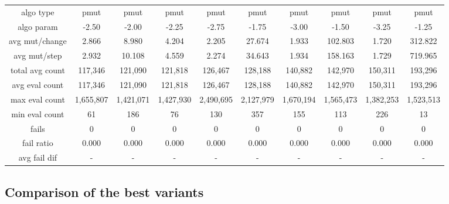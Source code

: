 \begin{tabular}[h]{cccccccccc}
algo type&                pmut&         pmut&         pmut&         pmut&         pmut&         pmut&         pmut&         pmut&         pmut\\
algo param&              -2.50&        -2.00&        -2.25&        -2.75&        -1.75&        -3.00&        -1.50&        -3.25&        -1.25\\
avg mut/change&          2.866&        8.980&        4.204&        2.205&       27.674&        1.933&      102.803&        1.720&      312.822\\
avg mut/step&            2.932&       10.108&        4.559&        2.274&       34.643&        1.934&      158.163&        1.729&      719.965\\
\hline
total avg count&       117,346&      121,090&      121,818&      126,467&      128,188&      140,882&      142,970&      150,311&      193,296\\
avg eval count&        117,346&      121,090&      121,818&      126,467&      128,188&      140,882&      142,970&      150,311&      193,296\\
max eval count&      1,655,807&    1,421,071&    1,427,930&    2,490,695&    2,127,979&    1,670,194&    1,565,473&    1,382,253&    1,523,513\\
min eval count&             61&          186&           76&          130&          357&          155&          113&          226&           13\\
\hline
fails&                       0&            0&            0&            0&            0&            0&            0&            0&            0\\
fail ratio&              0.000&        0.000&        0.000&        0.000&        0.000&        0.000&        0.000&        0.000&        0.000\\
avg fail dif&                -&            -&            -&            -&            -&            -&            -&            -&            -\\
\end{tabular}


\subsection{Comparison of the best variants}


